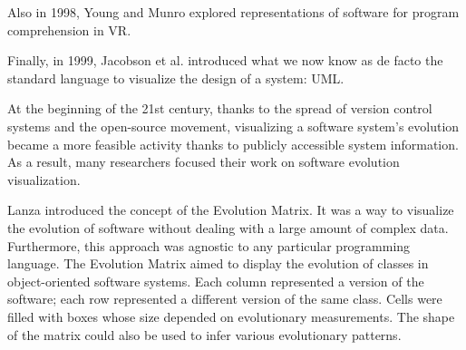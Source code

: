 \bigbreak
Also in 1998, Young and Munro \cite{Young1998} explored representations of software for program comprehension in VR. 

\bigbreak
Finally, in 1999, Jacobson et al. \cite{Jacobson1999} introduced what we now know as de facto the standard language to visualize the design of a system: UML. 



\bigbreak
At the beginning of the 21st century, thanks to the spread of version control systems and the open-source movement, 
visualizing a software system's evolution became a more feasible activity thanks to publicly accessible system information.   
As a result, many researchers focused their work on software evolution visualization.

\bigbreak
Lanza \cite{Lanza2001} introduced the concept of the Evolution Matrix. 
It was a way to visualize the evolution of software without dealing with a large amount of complex data. 
Furthermore, this approach was agnostic to any particular programming language. 
The Evolution Matrix aimed to display the evolution of classes in object-oriented software systems. 
Each column represented a version of the software; each row represented a different version of the same class.
Cells were filled with boxes whose size depended on evolutionary measurements. 
The shape of the matrix could also be used to infer various evolutionary patterns.

